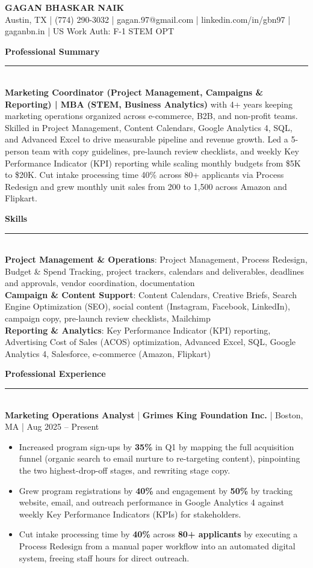 \documentclass[10pt,letterpaper]{article}
\newcommand{\sectiontitle}[1]{%
  \vspace{2pt}
  {\Large \textbf{#1}}\\[-3pt]
  \rule{\linewidth}{0.7pt}\\[1pt]
}
\newcommand{\job}[4]{%
  \textbf{#1} \;|\; \textbf{#2} \;|\; #3 \;|\; #4\par%
}
\begin{document}
{\Large \textbf{GAGAN BHASKAR NAIK}}\\[1pt]
Austin, TX \;|\; (774) 290-3032 \;|\; gagan.97@gmail.com \;|\; linkedin.com/in/gbn97 \;|\; gaganbn.in \;|\; US Work Auth: F-1 STEM OPT

\sectiontitle{Professional Summary}
\textbf{Marketing Coordinator (Project Management, Campaigns \& Reporting) | MBA (STEM, Business Analytics)} with 4+ years keeping marketing operations organized across e-commerce, B2B, and non-profit teams. Skilled in Project Management, Content Calendars, Google Analytics 4, SQL, and Advanced Excel to drive measurable pipeline and revenue growth. Led a 5-person team with copy guidelines, pre-launch review checklists, and weekly Key Performance Indicator (KPI) reporting while scaling monthly budgets from \$5K to \$20K. Cut intake processing time 40\% across 80+ applicants via Process Redesign and grew monthly unit sales from 200 to 1,500 across Amazon and Flipkart.

\sectiontitle{Skills}
\textbf{Project Management \& Operations}: Project Management, Process Redesign, Budget \& Spend Tracking, project trackers, calendars and deliverables, deadlines and approvals, vendor coordination, documentation\\
\textbf{Campaign \& Content Support}: Content Calendars, Creative Briefs, Search Engine Optimization (SEO), social content (Instagram, Facebook, LinkedIn), campaign copy, pre-launch review checklists, Mailchimp\\
\textbf{Reporting \& Analytics}: Key Performance Indicator (KPI) reporting, Advertising Cost of Sales (ACOS) optimization, Advanced Excel, SQL, Google Analytics 4, Salesforce, e-commerce (Amazon, Flipkart)

\sectiontitle{Professional Experience}

\job{Marketing Operations Analyst}{Grimes King Foundation Inc.}{Boston, MA}{Aug 2025 -- Present}
\begin{itemize}
  \item Increased program sign-ups by \textbf{35\%} in Q1 by mapping the full acquisition funnel (organic search to email nurture to re-targeting content), pinpointing the two highest-drop-off stages, and rewriting stage copy.
  \item Grew program registrations by \textbf{40\%} and engagement by \textbf{50\%} by tracking website, email, and outreach performance in Google Analytics 4 against weekly Key Performance Indicators (KPIs) for stakeholders.
  \item Cut intake processing time by \textbf{40\%} across \textbf{80+ applicants} by executing a Process Redesign from a manual paper workflow into an automated digital system, freeing staff hours for direct outreach.
\end{itemize}
\end{document}
